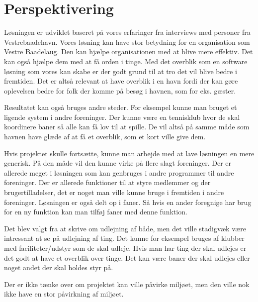 \chapter{Perspektivering}
\label{cha:perspektivering}


Løsningen er udviklet baseret på vores erfaringer fra interviews med personer fra Vestrebaadehavn. Vores løsning kan have stor betydning for en organisation som Vestre Baadelaug. Den kan hjælpe organisationen med at blive mere effektiv. Det kan også hjælpe dem med at få orden i tinge. Med det overblik som en software løsning som vores kan skabe er der godt grund til at tro det vil blive bedre i fremtiden. Det er altså relevant at have overblik i en havn fordi der kan gøre oplevelsen bedre for folk der komme på besøg i havnen, som for eks. gæster.

Resultatet kan også bruges andre steder. For eksempel kunne man bruget et ligende system i andre foreninger. Der kunne være en tennisklub hvor de skal koordinere baner så alle kan få lov til at spille. De vil altså på samme måde som havnen have glæde af at få et overblik, som et kort ville give dem.

Hvis projektet skulle fortsætte, kunne man arbejde med at lave løsningen en mere generisk. På den måde vil den kunne virke på flere slagt foreninger. Der er allerede meget i løsningen som kan genbruges i andre programmer til andre foreninger. Der er allerede funktioner til at styre medlemmer og der brugertilladelser, det er noget man ville kunne bruge i fremtiden i andre foreninger. Løsningen er også delt op i faner. Så hvis en ander foregnige har brug for en ny funktion kan man tilføj faner med denne funktion.

Det blev valgt fra at skrive om udlejning af både, men det ville stadigvæk være intressant at se på udlejning af ting. Det kunne for eksempel bruges af klubber med faciliteter/udstyr som de skal udleje. Hvis man har ting der skal udlejes er det godt at have et overblik over tinge. Det kan være baner der skal udlejes eller noget andet der skal holdes styr på.

Der er ikke tænke over om projektet kan ville påvirke miljøet, men den ville nok ikke have en stor påvirkning af miljøet.

